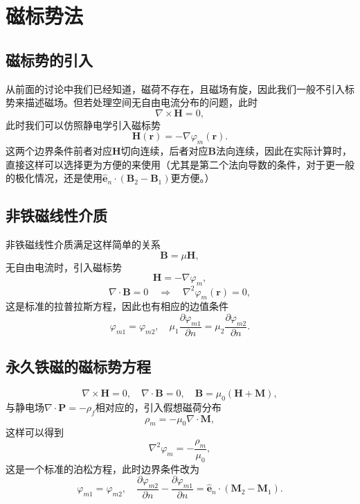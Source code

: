 \documentclass[UTF8]{ctexbook}
\renewcommand{\b}{\boldsymbol}
\numberwithin{equation}{chapter}
\begin{document}
	\section{磁标势法}
	\subsection{磁标势的引入}
	从前面的讨论中我们已经知道，磁荷不存在，且磁场有旋，因此我们一般不引入标势来描述磁场。但若处理空间无自由电流分布的问题，此时
	\[\nabla\times\b{H}=0,\]
	此时我们可以仿照静电学引入磁标势
	\[\b{H}(\b{r})=-\nabla\varphi_m(\b{r}).\]
	这两个边界条件前者对应$\b{H}$切向连续，后者对应$\b{B}$法向连续，因此在实际计算时，直接这样可以选择更为方便的来使用（尤其是第二个法向导数的条件，对于更一般的极化情况，还是使用$\hat{\b{e}}_n\cdot(\b{B}_2-\b{B}_1)$更方便。）
	
	\subsection{非铁磁线性介质}
	非铁磁线性介质满足这样简单的关系
	\[\b{B}=\mu\b{H},\]
	无自由电流时，引入磁标势
	\[\b{H}=-\nabla\varphi_m,\]
	\[\nabla\cdot\b{B}=0 \quad \Rightarrow \quad \nabla^2\varphi_m(\b{r})=0,\]
	这是标准的拉普拉斯方程，因此也有相应的边值条件
	\[\varphi_{m1}=\varphi_{m2},\quad \mu_1\frac{\partial \varphi_{m1}}{\partial n}=\mu_2\frac{\partial \varphi_{m2}}{\partial n}.\]
	
	\subsection{永久铁磁的磁标势方程}
	\[\nabla\times\b{H}=0,\quad \nabla\cdot\b{B}=0,\quad \b{B}=\mu_0(\b{H}+\b{M}),\]
	与静电场$\nabla\cdot\b{P}=-\rho_f$相对应的，引入假想磁荷分布
	\[\rho_m=-\mu_0\nabla\cdot\b{M},\]
	这样可以得到
	\[\nabla^2\varphi_m = -\frac{\rho_m}{\mu_0},\]
	这是一个标准的泊松方程，此时边界条件改为
	\[\varphi_{m1}=\varphi_{m2},\quad \frac{\partial \varphi_{m2}}{\partial n}-\frac{\partial \varphi_{m1}}{\partial n}=\hat{\b{e}}_n\cdot(\b{M}_2-\b{M}_1).\]
	
\end{document}

